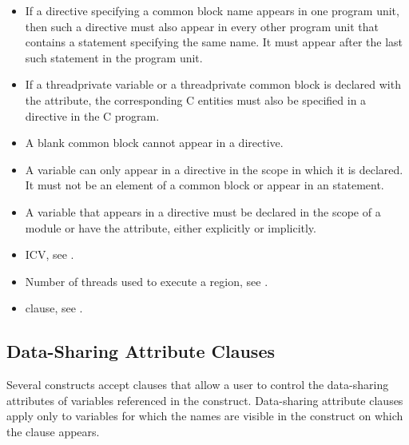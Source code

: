 {{{{\begin{itemize}
\item If a  directive specifying a common block name appears in one 
program unit, then such a directive must also appear in every other program unit that 
contains a  statement specifying the same name. It must appear after the last 
such  statement in the program unit.

\item If a threadprivate variable or a threadprivate common block is declared 
with the  attribute, the corresponding C entities must also be specified in a 
 directive in the C program.

\item A blank common block cannot appear in a  directive.

\item A variable can only appear in a  directive in the scope in which it 
is declared. It must not be an element of a common block or appear in an 
 statement.

\item A variable that appears in a  directive must be declared in the 
scope of a module or have the  attribute, either explicitly or implicitly.
\end{itemize} %
\fortranspecificend

\crossreferences
\begin{itemize}
\item {} ICV, see 
.

\item Number of threads used to execute a  region, see 
.

\item {} clause, see 
.
\end{itemize}








\subsection{Data-Sharing Attribute Clauses}
\label{subsec:Data-Sharing Attribute Clauses}
Several constructs accept clauses that allow a user to control the data-sharing attributes 
of variables referenced in the construct. Data-sharing attribute clauses apply only to 
variables for which the names are visible in the construct on which the clause appears.

}}}}

